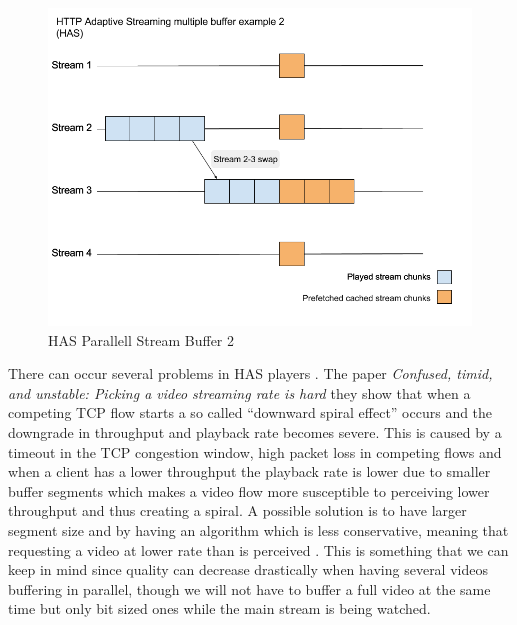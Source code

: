 \documentclass[9pt,a4paper]{acmproc}
\begin{document}
\begin{figure}[!ht]
\begin{center}
\includegraphics[scale=0.3]{HAS2.png}
\caption{HAS Parallell Stream Buffer 2}
\end{center}
\end{figure}


There can occur several problems in HAS players \cite[p.~317-326]{qualbranch}. The paper \textit{Confused, timid, and unstable: Picking a video streaming rate is hard} they show that when a competing TCP flow starts a so called “downward spiral effect” occurs and the downgrade in throughput and playback rate becomes severe\cite{streamrate}. This is caused by a timeout in the TCP congestion window, high packet loss in competing flows and when a client has a lower throughput the playback rate is lower due to smaller buffer segments which makes a video flow more susceptible to perceiving lower throughput and thus creating a spiral. A possible solution is to have larger segment size and by having an algorithm which is less conservative, meaning that requesting a video at lower rate than is perceived \cite{streamrate}. This is something that we can keep in mind since quality can decrease drastically when having several videos buffering in parallel, though we will not have to buffer a full video at the same time but only bit sized ones while the main stream is being watched.
\end{document}
